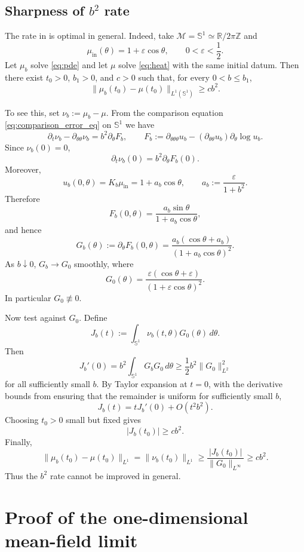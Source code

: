 \documentclass[11pt]{article}
\theoremstyle{definition}
\newcommand{\R}{\mathbb{R}}
\def\M{\mathcal M}
\begin{document}
\subsection{Sharpness of $b^2$ rate}\label{s:lowerbound}

The rate in  is optimal in general. Indeed, take
\(\M=\mathbb S^1\simeq\R/2\pi\mathbb Z\) and
\[
\mu_{\mathrm{in}}(\theta)=1+\varepsilon\cos\theta,
\qquad 0<\varepsilon<\frac12 .
\]
Let \(\mu_b\) solve \eqref{eq:pde} and let \(\mu\) solve \eqref{eq:heat} with
the same initial datum. Then there exist \(t_0>0\), \(b_1>0\), and \(c>0\) such
that, for every \(0<b\le b_1\),
\[
\|\mu_b(t_0)-\mu(t_0)\|_{L^1(\mathbb S^1)}\ge c b^2 .
\]

To see this, set \(\nu_b:=\mu_b-\mu\). From the comparison equation \eqref{eq:comparison_error_eq} on $\mathbb{S}^1$ we have
\[
\partial_t\nu_b-\partial_{\theta\theta}\nu_b
=
b^2\partial_\theta F_b,
\qquad
F_b:=\partial_{\theta\theta\theta}u_b
-
(\partial_{\theta\theta}u_b)\partial_\theta\log u_b .
\]
Since \(\nu_b(0)=0\),
\[
\partial_t\nu_b(0)=b^2\partial_\theta F_b(0).
\]
Moreover,
\[
u_b(0,\theta)=K_b\mu_{\mathrm{in}}
=
1+a_b\cos\theta,
\qquad
a_b:=\frac{\varepsilon}{1+b^2}.
\]
Therefore
\[
F_b(0,\theta)
=
\frac{a_b\sin\theta}{1+a_b\cos\theta},
\]
and hence
\[
G_b(\theta):=\partial_\theta F_b(0,\theta)
=
\frac{a_b(\cos\theta+a_b)}{(1+a_b\cos\theta)^2}.
\]
As \(b\downarrow0\), \(G_b\to G_0\) smoothly, where
\[
G_0(\theta)
=
\frac{\varepsilon(\cos\theta+\varepsilon)}
{(1+\varepsilon\cos\theta)^2}.
\]
In particular \(G_0\not\equiv0\).

Now test against \(G_0\). Define
\[
J_b(t):=\int_{\mathbb S^1}\nu_b(t,\theta)G_0(\theta)\,d\theta .
\]
Then
\[
J_b'(0)
=
b^2\int_{\mathbb S^1}G_bG_0\,d\theta
\ge
\frac12 b^2\|G_0\|_{L^2}^2
\]
for all sufficiently small \(b\). By Taylor expansion at \(t=0\), 
with the derivative bounds from  ensuring that the remainder is uniform for sufficiently small $b$,
\[
J_b(t)=tJ_b'(0)+O(t^2b^2).
\]
Choosing \(t_0>0\) small but fixed gives
\[
|J_b(t_0)|\ge c b^2 .
\]
Finally,
\[
\|\mu_b(t_0)-\mu(t_0)\|_{L^1}
=
\|\nu_b(t_0)\|_{L^1}
\ge
\frac{|J_b(t_0)|}{\|G_0\|_{L^\infty}}
\ge
c b^2 .
\]
Thus the \(b^2\) rate cannot be improved in general.


\section{Proof of the one-dimensional mean-field limit}\label{sec:s1}
\end{document}
